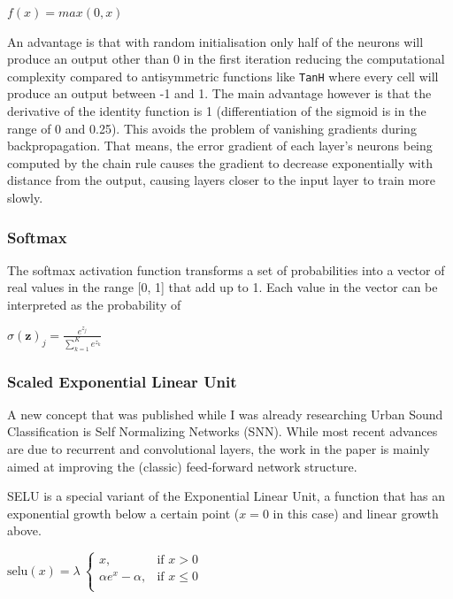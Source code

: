 {\centering
	$\displaystyle f(x)=max(0, x)$\par
}


An advantage is that with random initialisation only half of the neurons will produce an output other than 0 in the first iteration reducing the computational complexity compared to antisymmetric functions like \texttt{TanH} where every cell will produce an output between -1 and 1.
The main advantage however is that the derivative of the identity function is 1 (differentiation of the sigmoid is in the range of 0 and 0.25). This avoids the problem of vanishing gradients \cite{Hochreiter:01book} during backpropagation. That means, the error gradient of each layer's neurons being computed by the chain rule causes the gradient to decrease exponentially with distance from the output, causing layers closer to the input layer to train more slowly.


\subsubsection{Softmax}
The softmax activation function transforms a set of probabilities into a vector of real values in the range [0, 1] that add up to 1. Each value in the vector can be interpreted as the probability of 

{\centering
	$\displaystyle \sigma (\mathbf {z} )_{j}={\frac {e^{z_{j}}}{\sum _{k=1}^{K}e^{z_{k}}}}$
	\par
}


\subsubsection{Scaled Exponential Linear Unit}
\label{selu}


A new concept that was published while I was already researching Urban Sound Classification is Self Normalizing Networks (SNN). While most recent advances are due to  recurrent and convolutional layers, the work in the paper \cite{DBLP:journals/corr/KlambauerUMH17} is mainly aimed at improving the (classic) feed-forward network structure.

SELU is a special variant of the Exponential Linear Unit, a function that has an exponential growth below a certain point ($x = 0$ in this case) and linear growth above. 
 


{\centering
	$\displaystyle \text{selu}(x) = \lambda\ \begin{cases}
    x,& \text{if } x > 0\\
    \alpha e^{x} - \alpha,& \text{if } x\leq 0\\
	\end{cases}$
	\par
}

